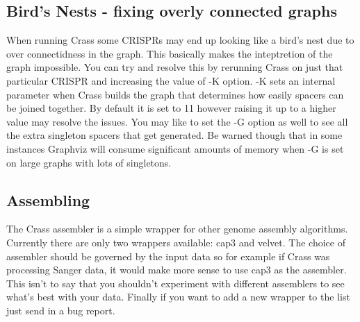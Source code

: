 \documentclass[11pt]{article} %
\begin{document}
\subsection{Bird's Nests - fixing overly connected graphs}
When running Crass some CRISPRs may end up looking like a bird's nest due to over connectidness in the graph.  This basically makes the inteptretion of the graph impossible.  You can try and resolve this by rerunning Crass on just that particular CRISPR and increasing the value of -K option.  -K sets an internal parameter when Crass builds the graph that determines how easily spacers can be joined together.  By default it is set to 11 however raising it up to a higher value may resolve the issues.  You may like to set the -G option as well to see all the extra singleton spacers that get generated.  Be warned though that in some instances Graphviz will consume significant amounts of memory when -G is set on large graphs with lots of singletons.
\subsection{Assembling}
The Crass assembler is a simple wrapper for other genome assembly algorithms.  Currently there are only two wrappers available: cap3 and velvet.  The choice of assembler should be governed by the input data so for example if Crass was processing Sanger data, it would make more sense to use cap3 as the assembler.  This isn't to say that you shouldn't experiment with different assemblers to see what's best with your data.  Finally if you want to add a new wrapper to the list just send in a bug report.
\end{document}
